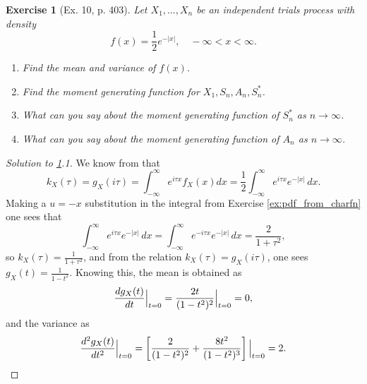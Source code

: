 \documentclass[letterpaper, 10 pt, conference]{article}
\newtheorem{ex}{Exercise}
\begin{document}
\begin{ex}[Ex. 10, p. 403] \label{ex:ind_trials}
	Let $X_1, \dots, X_n$ be an independent trials process with density 
	\begin{equation*}
		f(x) = \frac{1}{2} e^{-|x|}, \quad -\infty < x < \infty.
	\end{equation*}
	\begin{enumerate}
		\item Find the mean and variance of $f(x)$.
		\item Find the moment generating function for $X_1, S_n, A_n, S_{n}^{\ast}$.
		\item What can you say about the moment generating function of $S_{n}^{\ast}$ as $n \rightarrow \infty$.
		\item What can you say about the moment generating function of $A_n$ as $n \rightarrow \infty$.
	\end{enumerate}
\end{ex}
\begin{proof}[Solution to \ref{ex:ind_trials}.1]
	We know from \citet{snell} that
	\begin{equation}
		k_X (\tau) = g_X (i \tau) = \int_{-\infty}^{\infty} e^{i \tau x} f_X (x) dx =\frac{1}{2} \int_{-\infty}^{\infty} e^{i \tau x} e^{-|x|} \, dx.
	\end{equation}
	Making a $u = -x$ substitution in the integral from Exercise \ref{ex:pdf_from_charfn} one sees that 
	\begin{equation}
		\int_{-\infty}^{\infty} e^{i \tau x} e^{-|x|} \, dx = \int_{-\infty}^{\infty} e^{-i \tau x} e^{-|x|} \, dx = \frac{2}{1 + \tau^2},
	\end{equation}
	so $k_X (\tau) = \frac{1}{1 + \tau^2}$, and from the relation $k_X (\tau) =  g_X (i \tau)$, one sees $g_X (t) = \frac{1}{1 - t^2}$. Knowing this, the mean is obtained as
	\begin{equation}
		\frac{d g_X (t)}{dt} \Big{\lvert}_{t=0} = \frac{2t}{(1-t^2)^2} \Big{\lvert}_{t = 0} = 0,
	\end{equation}
	and the variance as 
	\begin{equation}
	\frac{d^2 g_X (t)}{dt^2} \Big{\lvert}_{t=0} = \left\lbrack \frac{2}{(1-t^2)^2} + \frac{8t^2}{(1-t^2)^3}\right\rbrack \Big{\lvert}_{t = 0} = 2.
	\end{equation}
\end{proof}
\end{document}
